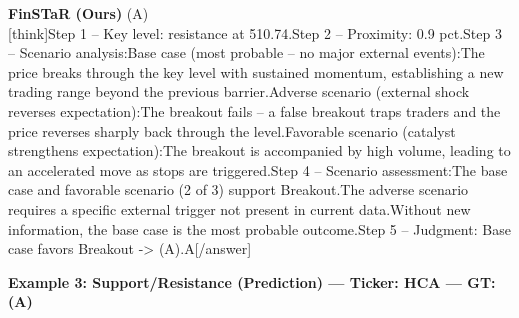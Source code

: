 \begin{minipage}[t]{0.41\textwidth}
\colorbox{green!10}{\parbox{\dimexpr\textwidth-2\fboxsep}{
\textbf{FinSTaR (Ours)} \textcolor{green!50!black}{(A)} \\[2pt]
\tiny
[think]\newline Step 1 -- Key level: resistance at 510.74.\newline Step 2 -- Proximity: 0.9 pct.\newline Step 3 -- Scenario analysis:\newline   Base case (most probable -- no major external events):\newline     The price breaks through the key level with sustained momentum, establishing a new trading range beyond the previous barrier.\newline   Adverse scenario (external shock reverses expectation):\newline     The breakout fails -- a false breakout traps traders and the price reverses sharply back through the level.\newline   Favorable scenario (catalyst strengthens expectation):\newline     The breakout is accompanied by high volume, leading to an accelerated move as stops are triggered.\newline Step 4 -- Scenario assessment:\newline   The base case and favorable scenario (2 of 3) support Breakout.\newline   The adverse scenario requires a specific external trigger not present in current data.\newline   Without new information, the base case is the most probable outcome.\newline Step 5 -- Judgment: Base case favors Breakout -> (A).\newline [/think]\newline [answer]A[/answer]
}}
\end{minipage}
\vspace{8pt}


\noindent
\textbf{Example 3: Support/Resistance (Prediction) --- Ticker: HCA --- GT: (A)}
\vspace{2pt}

